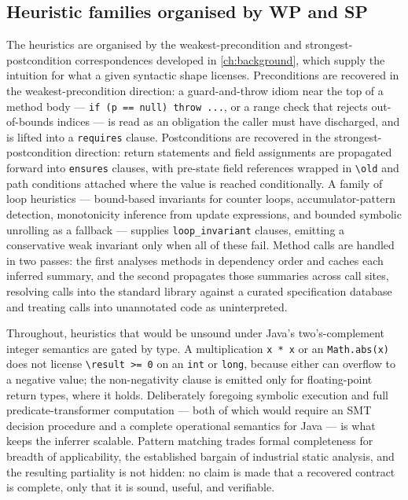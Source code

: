 \subsection{Heuristic families organised by WP and SP}
\label{sec:inf-heuristics}

The heuristics are organised by the weakest-precondition and
strongest-postcondition correspondences developed in \cref{ch:background}, which
supply the intuition for what a given syntactic shape licenses. Preconditions are
recovered in the weakest-precondition direction: a guard-and-throw idiom near the
top of a method body --- \lstinline|if (p == null) throw ...|, or a range check that
rejects out-of-bounds indices --- is read as an obligation the caller must have
discharged, and is lifted into a \texttt{requires} clause. Postconditions are
recovered in the strongest-postcondition direction: return statements and field
assignments are propagated forward into \texttt{ensures} clauses, with pre-state
field references wrapped in \lstinline|\old| and path conditions attached where the
value is reached conditionally. A family of loop heuristics --- bound-based
invariants for counter loops, accumulator-pattern detection, monotonicity inference
from update expressions, and bounded symbolic unrolling as a fallback --- supplies
\texttt{loop\_invariant} clauses, emitting a conservative weak invariant only when
all of these fail. Method calls are handled in two passes: the first analyses
methods in dependency order and caches each inferred summary, and the second
propagates those summaries across call sites, resolving calls into the standard
library against a curated specification database and treating calls into
unannotated code as uninterpreted.

Throughout, heuristics that would be unsound under Java's two's-complement integer
semantics are gated by type. A multiplication \lstinline|x * x| or an
\lstinline|Math.abs(x)| does not license \lstinline|\result >= 0| on an
\lstinline|int| or \lstinline|long|, because either can overflow to a negative
value; the non-negativity clause is emitted only for floating-point return types,
where it holds. Deliberately foregoing symbolic execution and full
predicate-transformer computation --- both of which would require an SMT decision
procedure and a complete operational semantics for Java --- is what keeps the
inferrer scalable. Pattern matching trades formal completeness for breadth of
applicability, the established bargain of industrial static analysis, and the
resulting partiality is not hidden: no claim is made that a recovered contract is
complete, only that it is sound, useful, and verifiable.

